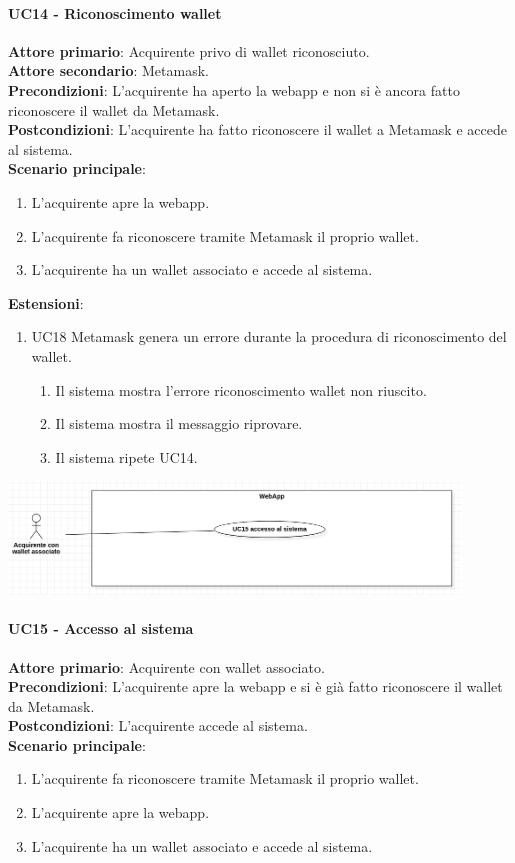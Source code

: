 \documentclass[a4paper, 12pt]{article}
\begin{document}
\paragraph{UC14 - Riconoscimento wallet}
\textbf{Attore primario}: Acquirente privo di wallet riconosciuto.\\
\textbf{Attore secondario}: Metamask.\\
\textbf{Precondizioni}: L'acquirente ha aperto la webapp e non si è ancora fatto riconoscere il wallet da Metamask.\\
\textbf{Postcondizioni}: L'acquirente ha fatto riconoscere il wallet a Metamask e accede al sistema.\\
\textbf{Scenario principale}:
\begin{enumerate}
    \item L’acquirente apre la webapp.
    \item L’acquirente fa riconoscere tramite Metamask il proprio wallet.
    \item L’acquirente ha un wallet associato e accede al sistema.
\end{enumerate}
\textbf{Estensioni}:
\begin{enumerate}
    \item UC18 Metamask genera un errore durante la procedura di riconoscimento del wallet.
    \begin{enumerate}
        \item Il sistema mostra l'errore riconoscimento wallet non riuscito.
        \item Il sistema mostra il messaggio riprovare.
        \item Il sistema ripete UC14.
    \end{enumerate}
\end{enumerate}

\includegraphics[width=0.9\textwidth]{UseCase_webapp2}

\paragraph{UC15 - Accesso al sistema}
\textbf{Attore primario}: Acquirente con wallet associato.\\
\textbf{Precondizioni}: L'acquirente apre la webapp e si è già fatto riconoscere il wallet da Metamask.\\
\textbf{Postcondizioni}: L'acquirente accede al sistema.\\
\textbf{Scenario principale}:
\begin{enumerate}
    \item L'acquirente fa riconoscere tramite Metamask il proprio wallet.
    \item L'acquirente apre la webapp.
    \item L'acquirente ha un wallet associato e accede al sistema.
\end{enumerate}
\end{document}
